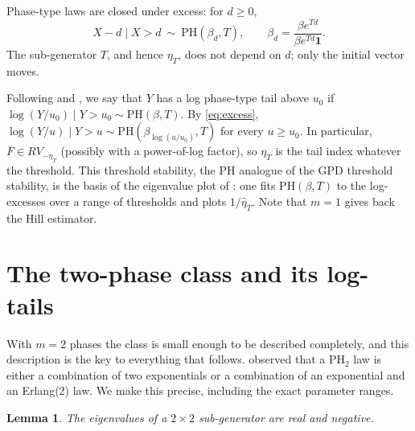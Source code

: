 \documentclass[12pt]{article}
\newtheorem{lemma}[theorem]{Lemma}
\theoremstyle{definition}
\theoremstyle{remark}
\newcommand{\bF}{\overline{F}}
\newcommand{\PH}{\mathrm{PH}}
\begin{document}
Phase-type laws are closed under excess: for $d\ge 0$,
\begin{equation}\label{eq:excess}
X-d\mid X>d\ \sim\ \PH(\beta_d,T),\qquad \beta_d=\frac{\beta e^{Td}}{\beta e^{Td}\mathbf 1}.
\end{equation}
The sub-generator $T$, and hence $\eta_T$, does not depend on $d$; only the initial vector moves.

Following \citet{Ahn2012} and \citet{KimKim2015}, we say that $Y$ has a log phase-type tail above $u_0$ if $\log(Y/u_0)\mid Y>u_0\sim\PH(\beta,T)$. By \eqref{eq:excess}, $\log(Y/u)\mid Y>u\sim\PH(\beta_{\log(u/u_0)},T)$ for every $u\ge u_0$. In particular, $\bF\in RV_{-\eta_T}$ (possibly with a power-of-log factor), so $\eta_T$ is the tail index whatever the threshold. This threshold stability, the PH analogue of the GPD threshold stability, is the basis of the eigenvalue plot of \citet{KimKim2015}: one fits $\PH(\beta,T)$ to the log-excesses over a range of thresholds and plots $1/\hat\eta_T$. Note that $m=1$ gives back the Hill estimator.

\section{The two-phase class and its log-tails}\label{sec:ph2}

With $m=2$ phases the class is small enough to be described completely, and this description is the key to everything that follows. \citet{DicksonHipp2000} observed that a PH$_2$ law is either a combination of two exponentials or a combination of an exponential and an Erlang(2) law. We make this precise, including the exact parameter ranges.

\begin{lemma}\label{lem:eigen}
The eigenvalues of a $2\times 2$ sub-generator are real and negative.
\end{lemma}
\end{document}
